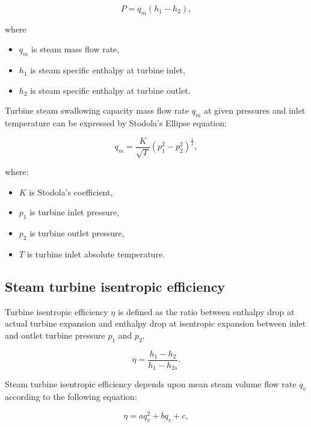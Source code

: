 \documentclass{article}
\begin{document}
	\begin{equation}\label{eq:power}
		P = q_m(h_1 - h_2),
	\end{equation}
	
	\noindent
	where 
	
	\begin{itemize}
		\item $q_m$ is steam mass flow rate, 
		\item $h_1$ is steam specific enthalpy at turbine inlet,
		\item $h_2$ is steam specific enthalpy at turbine outlet.
	\end{itemize}

	Turbine steam swallowing capacity mass flow rate $q_m$ at given pressures and inlet temperature can be expressed by Stodola’s Ellipse equation:
	
	\begin{equation}\label{eq:stodola}
		q_m = \frac{K}{\sqrt{T}}(p_1^2 - p_2^2)^\frac{1}{2},
	\end{equation}
	
	\noindent
	where:
	
	\begin{itemize}
		\item $K$ is Stodola’s coefficient, 
		\item $p_1$ is turbine inlet pressure,
		\item $p_2$ is turbine outlet pressure,
		\item $T$ is turbine inlet absolute temperature.
	\end{itemize}
	
	\subsection{Steam turbine isentropic efficiency}
	
	Turbine isentropic efficiency $\eta$ is defined as the ratio between enthalpy drop at actual turbine expansion and enthalpy drop at isentropic expansion between inlet and outlet turbine pressure $p_1$ and $p_2$.
	
	\begin{equation}\label{eq:eta}
		\eta = \frac{h_1-h_2}{h_1 - h_{2s}}.
	\end{equation}
	
	Steam turbine isentropic efficiency depends upon mean steam volume flow 
	rate $q_v$ according to the following equation:
	
	\begin{equation}\label{eq:eta2}
		\eta = aq_v^2 + bq_v + c,
	\end{equation}
	
\end{document}
